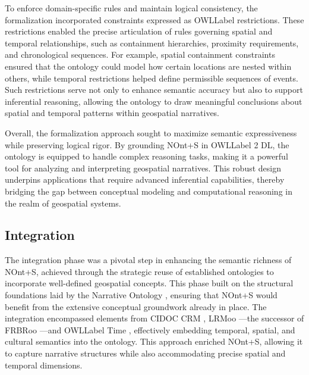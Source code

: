 To enforce domain-specific rules and maintain logical consistency, the formalization incorporated constraints expressed as \acrshort{OWLLabel} restrictions. These restrictions enabled the precise articulation of rules governing spatial and temporal relationships, such as containment hierarchies, proximity requirements, and chronological sequences. For example, spatial containment constraints ensured that the ontology could model how certain locations are nested within others, while temporal restrictions helped define permissible sequences of events. Such restrictions serve not only to enhance semantic accuracy but also to support inferential reasoning, allowing the ontology to draw meaningful conclusions about spatial and temporal patterns within geospatial narratives.

Overall, the formalization approach sought to maximize semantic expressiveness while preserving logical rigor. By grounding NOnt+S in \acrshort{OWLLabel} 2 DL, the ontology is equipped to handle complex reasoning tasks, making it a powerful tool for analyzing and interpreting geospatial narratives. This robust design underpins applications that require advanced inferential capabilities, thereby bridging the gap between conceptual modeling and computational reasoning in the realm of geospatial systems.

\subsection{Integration}\label{IV-subsec:integration}

The integration phase was a pivotal step in enhancing the semantic richness of NOnt+S, achieved through the strategic reuse of established ontologies to incorporate well-defined geospatial concepts. This phase built on the structural foundations laid by the Narrative Ontology \cite{meghiniRepresentingNarrativesDigital2021}, ensuring that NOnt+S would benefit from the extensive conceptual groundwork already in place. The integration encompassed elements from CIDOC CRM \cite{doerrCIDOCConceptualReference2007a}, LRMoo \cite{rivaLRMooHighlevelModel2022}—the successor of FRBRoo \cite{doerrFRBROOCONCEPTUALMODEL2008}—and \acrshort{OWLLabel} Time \cite{TimeOntologyOWL}, effectively embedding temporal, spatial, and cultural semantics into the ontology. This approach enriched NOnt+S, allowing it to capture narrative structures while also accommodating precise spatial and temporal dimensions.

